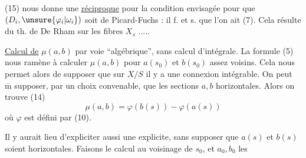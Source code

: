 (15) nous donne une \uline{réciproque} pour la condition envisagée pour que $(D_i,\unsure{\varphi_i|\omega_i})$ soit de Picard-Fuchs : il f. et s. que l'on ait (7). Cela résulte du th. de De Rham sur les fibres $X_s$ .....

\uline{Calcul de} $\mu(a,b)$ par voie ``algébrique'', sans calcul d'intégrale.  La formule (5) nous ramène à calculer $\mu(a,b)$  pour  $a(s_0)$ et $b(s_0)$ assez voisins. Cela nous permet alors de supposer que sur $X/S$ il y a une connexion intégrable. On peut $\overline{\mathrm m}$ supposer, par un choix convenable, que les sections $a,b$  horizontales. Alors on trouve (14)
\[
 \mu(a,b)=\varphi(b(s))-\varphi(a(s))
\]
où $\varphi$ est défini par (10).

Il y aurait lieu d'expliciter aussi une  explicite, sans supposer que $a(s)$ et $b(s)$ soient horizontales. Faisons le calcul au voisinage de $s_0$, et  $a_0,b_0$ les
